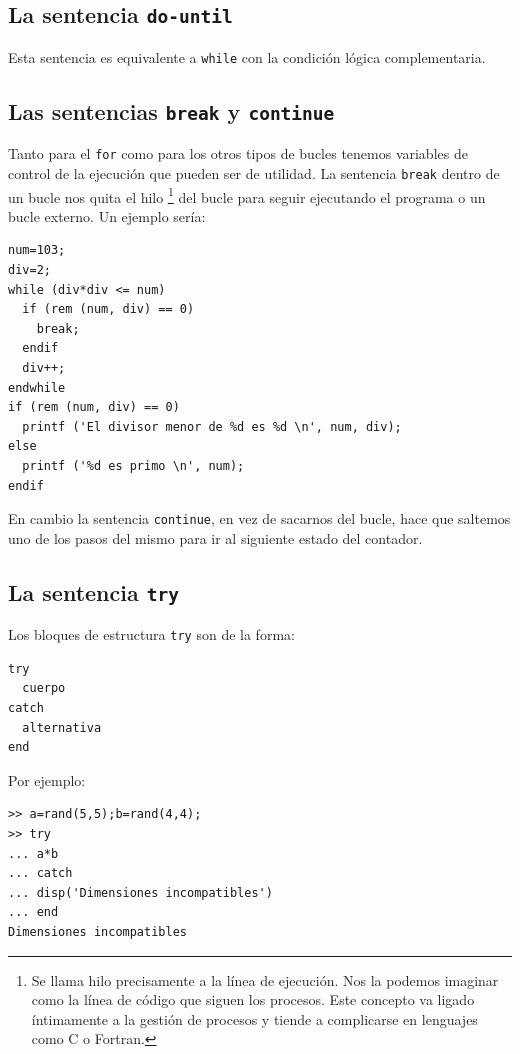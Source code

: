 \subsection{La sentencia \texttt{do-until}}

Esta sentencia es equivalente a \texttt{while} con la condición lógica
complementaria.


\subsection{Las sentencias \texttt{break} y
  \texttt{continue}}

Tanto para el \texttt{for} como para los otros tipos de bucles tenemos
variables de control de la ejecución que pueden ser de utilidad. La
sentencia \texttt{break} dentro de un bucle nos quita el hilo%
\footnote{Se llama hilo precisamente a la línea de ejecución. Nos la
  podemos imaginar como la línea de código que siguen los procesos.
  Este concepto va ligado íntimamente a la gestión de procesos y
  tiende a complicarse en lenguajes como C o Fortran.%
} del bucle para seguir ejecutando el programa o un bucle externo.  Un
ejemplo sería:

\begin{verbatim}
num=103;   
div=2;   
while (div*div <= num)   
  if (rem (num, div) == 0)   
    break;   
  endif   
  div++;   
endwhile   
if (rem (num, div) == 0)   
  printf ('El divisor menor de %d es %d \n', num, div);   
else   
  printf ('%d es primo \n', num);   
endif
\end{verbatim}
En cambio la sentencia \texttt{continue}, en vez de sacarnos del
bucle, hace que saltemos uno de los pasos del mismo para ir al
siguiente estado del contador.


\subsection{La sentencia \texttt{try}}

Los bloques de estructura \texttt{try} son de la forma:

\begin{verbatim}
try
  cuerpo
catch 
  alternativa
end
\end{verbatim}

Por ejemplo:
\begin{verbatim}
>> a=rand(5,5);b=rand(4,4);
>> try
... a*b
... catch
... disp('Dimensiones incompatibles')
... end
Dimensiones incompatibles
\end{verbatim}

